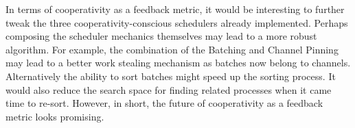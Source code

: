 In terms of cooperativity as a feedback metric, it would be interesting to further
tweak the three cooperativity-conscious schedulers already implemented. Perhaps 
composing the scheduler mechanics themselves may lead to a more robust algorithm.
For example, the combination of the Batching and Channel Pinning may lead to a better
work stealing mechanism as batches now belong to channels. Alternatively the ability
to sort batches might speed up the sorting process. It would also reduce the search
space for finding related processes when it came time to re-sort. However, in short, 
the future of cooperativity as a feedback metric looks promising.

